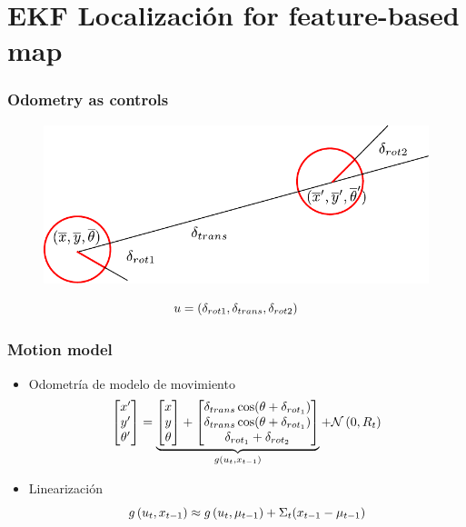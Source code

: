 \section{EKF Localización for feature-based map}

\begin{frame}
	\frametitle{Odometry as controls}
	
   	\begin{figure}[!h]
        \includegraphics[width=0.6\columnwidth]{./images/odometry_as_controls.pdf}
    \end{figure}

    \begin{equation*}
        u = (\delta_{rot1}, \delta_{trans}, \delta_{rot2})
    \end{equation*}
	
\end{frame}

\begin{frame}
	\frametitle{Motion model}
	
	\begin{itemize}
		\item Odometría de modelo de movimiento
		\begin{equation*}
			\begin{bmatrix}
				x^{\prime} \\
				y^{\prime} \\
				\theta^{\prime}
			\end{bmatrix} =
			\underbrace{
				\begin{bmatrix}
				x \\
				y \\
				\theta
			\end{bmatrix} +
			\begin{bmatrix}
				\delta_{trans}\cos(\theta+\delta_{rot_{1}}) \\
				\delta_{trans}\cos(\theta+\delta_{rot_{1}}) \\
				\delta_{rot_{1}} + \delta_{rot_{2}}
			\end{bmatrix}
			}_{g\left( u_{t}, x_{t-1} \right)} + \mathcal{N}\left( {0}, {R_{t}} \right)
		\end{equation*}
		\item Linearización
		\begin{equation*}
			g\left( u_{t}, x_{t-1} \right) \approx 			g\left( u_{t}, \mu_{t-1} \right) + \Sigma_{t}(x_{t-1}-\mu_{t-1})
		\end{equation*}
	\end{itemize}
	
\end{frame}


